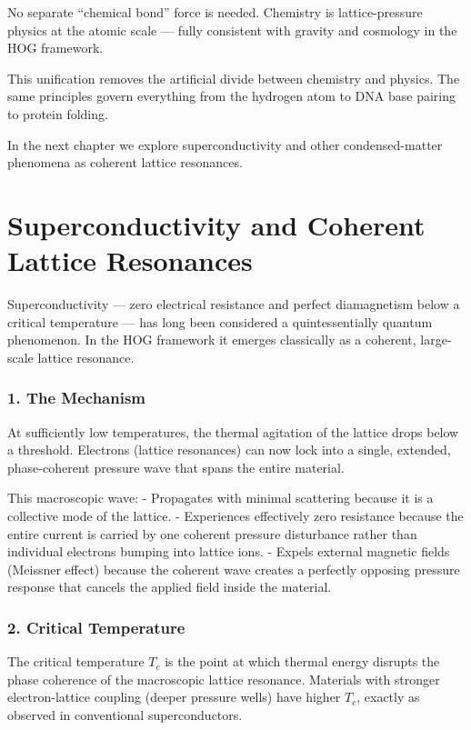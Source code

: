 \documentclass[11pt,a4paper]{book}
\begin{document}
{No separate “chemical bond” force is needed. Chemistry is lattice-pressure physics at the atomic scale — fully consistent with gravity and cosmology in the HOG framework.

This unification removes the artificial divide between chemistry and physics. The same principles govern everything from the hydrogen atom to DNA base pairing to protein folding.

In the next chapter we explore superconductivity and other condensed-matter phenomena as coherent lattice resonances.

\chapter{Superconductivity and Coherent Lattice Resonances}

Superconductivity — zero electrical resistance and perfect diamagnetism below a critical temperature — has long been considered a quintessentially quantum phenomenon. In the HOG framework it emerges classically as a coherent, large-scale lattice resonance.

\subsection{1. The Mechanism}
At sufficiently low temperatures, the thermal agitation of the lattice drops below a threshold. Electrons (lattice resonances) can now lock into a single, extended, phase-coherent pressure wave that spans the entire material.

This macroscopic wave:
- Propagates with minimal scattering because it is a collective mode of the lattice.
- Experiences effectively zero resistance because the entire current is carried by one coherent pressure disturbance rather than individual electrons bumping into lattice ions.
- Expels external magnetic fields (Meissner effect) because the coherent wave creates a perfectly opposing pressure response that cancels the applied field inside the material.

\subsection{2. Critical Temperature}
The critical temperature \( T_c \) is the point at which thermal energy disrupts the phase coherence of the macroscopic lattice resonance. Materials with stronger electron-lattice coupling (deeper pressure wells) have higher \( T_c \), exactly as observed in conventional superconductors.

}
\end{document}
